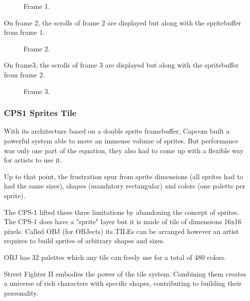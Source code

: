 \begin{figure}[H]
 \caption*{Frame 1.}%
 \end{figure}%

On frame 2, the scrolls of frame 2 are displayed but along with the spritebuffer from frame 1.
 

\begin{figure}[H]
 \caption*{Frame 2.}%
 \end{figure}%

On frame3, the scrolls of frame 3 are displayed but along with the spritebuffer from frame 2.

\begin{figure}[H]
 \caption*{Frame 3.}%
 \end{figure}%





\subsubsection{CPS1 Sprites Tile}
With its architecture based on a double sprite framebuffer, Capcom built a powerful system able to move an immense volume of sprites. But performance was only one part of the equation, they also had to come up with a flexible way for artists to use it.

Up to that point, the frustration spur from sprite dimensions (all sprites had to had the same sizes), shapes (mandatory rectangular) and colors (one palette per sprite). 

The CPS-1 lifted these three limitations by abandoning the concept of sprites. The CPS-1 does have a "sprite" layer but it is made of tile of dimensions 16x16 pixels. Called OBJ (for OBJects) its TILEs can be arranged however an artist requires to build sprites of arbitrary shapes and sizes. 

OBJ has 32 palettes which any tile can freely use for a total of 480 colors.

\pagebreak

Street Fighter II embodies the power of the tile system. Combining them creates a universe of rich characters with specific shapes, contributing to building their personality.

\begin{minipage}[t]{0.453\linewidth}
\end{minipage}%
\hfill%
\begin{minipage}[t]{0.53\linewidth}
\end{minipage}


